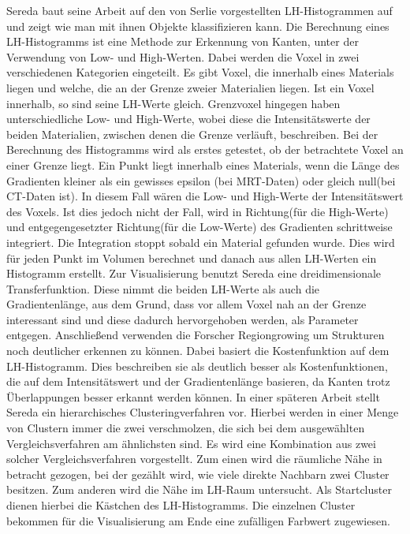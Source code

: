 Sereda baut seine Arbeit \cite{sereda2006visualization} auf den von Serlie \cite{serlie2003computed} vorgestellten LH-Histogrammen auf und zeigt wie man mit ihnen Objekte klassifizieren kann.
\newline
Die Berechnung eines LH-Histogramms ist eine Methode zur Erkennung von Kanten, unter der Verwendung von Low- und High-Werten. Dabei werden die Voxel in zwei verschiedenen Kategorien eingeteilt. Es gibt Voxel, die  innerhalb eines Materials liegen und welche, die  an der Grenze zweier Materialien liegen. Ist ein Voxel innerhalb, so sind seine LH-Werte gleich. Grenzvoxel hingegen haben unterschiedliche Low- und High-Werte, wobei diese die Intensitätswerte der beiden Materialien, zwischen denen die Grenze verläuft, beschreiben. 
\newline
Bei der Berechnung des Histogramms wird als erstes getestet, ob der betrachtete Voxel an einer Grenze liegt. Ein Punkt liegt innerhalb eines Materials, wenn  die Länge des Gradienten kleiner als ein gewisses epsilon (bei MRT-Daten) oder gleich null(bei CT-Daten ist). In diesem Fall wären die Low- und High-Werte der Intensitätswert des Voxels. Ist dies jedoch nicht der Fall, wird in Richtung(für die High-Werte) und entgegengesetzter Richtung(für die Low-Werte) des Gradienten schrittweise integriert. Die Integration stoppt sobald ein Material gefunden wurde. Dies wird für jeden Punkt im Volumen berechnet und danach aus allen LH-Werten ein Histogramm erstellt.
\newline 
Zur Visualisierung benutzt Sereda eine dreidimensionale Transferfunktion. Diese nimmt die beiden LH-Werte als auch die Gradientenlänge, aus dem Grund, dass vor allem Voxel nah an der Grenze interessant sind und diese dadurch hervorgehoben werden, als Parameter entgegen.
\newline
Anschließend verwenden die Forscher Regiongrowing um Strukturen noch deutlicher erkennen zu können. Dabei basiert die Kostenfunktion auf dem LH-Histogramm. Dies beschreiben sie als deutlich besser als Kostenfunktionen, die auf dem Intensitätswert und der Gradientenlänge basieren, da Kanten trotz Überlappungen besser erkannt werden können.
\newline
In einer späteren Arbeit \cite{sereda2006automating} stellt Sereda ein hierarchisches Clusteringverfahren vor. Hierbei werden in einer Menge von Clustern immer die zwei verschmolzen, die sich bei dem ausgewählten Vergleichsverfahren am ähnlichsten sind. Es wird eine Kombination aus zwei solcher Vergleichsverfahren vorgestellt. Zum einen wird die räumliche Nähe in betracht gezogen, bei der gezählt wird, wie viele direkte Nachbarn zwei Cluster besitzen. Zum anderen wird die Nähe im LH-Raum untersucht. Als Startcluster dienen hierbei die Kästchen des LH-Histogramms. Die einzelnen Cluster bekommen für die Visualisierung am Ende eine zufälligen Farbwert zugewiesen. 


